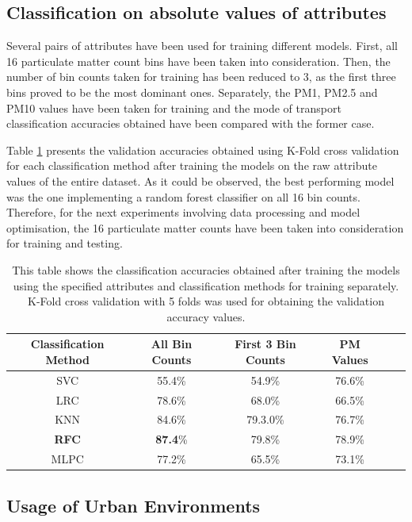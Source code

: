 \documentclass[bsc,frontabs,twoside,singlespacing, parskip,deptreport]{infthesis}     %
\begin{document}
\subsection{Classification on absolute values of attributes}
\label{subsec:abs-values-models}

Several pairs of attributes have been used for training different models. First, all 16 particulate matter count bins have been taken into consideration. Then, the number of bin counts taken for training has been reduced to 3, as the first three bins proved to be the most dominant ones. Separately, the PM1, PM2.5 and PM10 values have been taken for training and the mode of transport classification accuracies obtained have been compared with the former case. 

Table \ref{table:abs-values-models} presents the validation accuracies obtained using K-Fold cross validation for each classification method after training the models on the raw attribute values of the entire dataset. As it could be observed, the best performing model was the one implementing a random forest classifier on all 16 bin counts. Therefore, for the next experiments involving data processing and model optimisation, the 16 particulate matter counts have been taken into consideration for training and testing.

\begin{table}[h!]
\centering
 \begin{tabular}{||c | c | c | c | c | c||} 
 \hline
 Classification Method & All Bin Counts & First 3 Bin Counts & PM Values \\ [0.5ex] 
 \hline\hline
 SVC & 55.4\% & 54.9\% & 76.6\% \\ 
 \hline
 LRC & 78.6\% & 68.0\% & 66.5\% \\
 \hline
 KNN & 84.6\% & 79.3.0\% & 76.7\% \\ 
 \hline
 \textbf{RFC} & \textbf{87.4}\% & 79.8\% & 78.9\% \\ 
 \hline
  MLPC & 77.2\% & 65.5\% & 73.1\% \\ 
 \hline
\end{tabular}
\caption{This table shows the classification accuracies obtained after training the models using the specified attributes and classification methods for training separately. K-Fold cross validation with 5 folds was used for obtaining the validation accuracy values.}
\label{table:abs-values-models}
\end{table}


\subsection{Usage of Urban Environments}
\label{subsec:results-urban-env-use}
\end{document}
